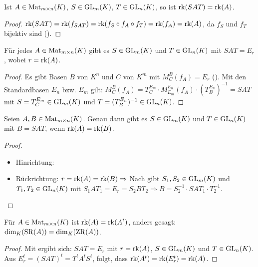 \begin{lemma}
	Ist $A\in \operatorname{Mat}_{m\times n}(K)$, $S\in \operatorname{GL}_m(K)$, $T\in \operatorname{GL}_n(K)$, so ist $\operatorname{rk}(SAT)=\operatorname{rk}(A)$.
\end{lemma}
\begin{proof}
	$\operatorname{rk}(SAT)=\operatorname{rk}(f_{SAT})=\operatorname{rk}(f_S\circ f_A\circ f_T)=\operatorname{rk}(f_A)=\operatorname{rk}(A)$, da $f_S$ und $f_T$ bijektiv sind ().
\end{proof}

\begin{proposition}
	Für jedes $A\in \operatorname{Mat}_{m\times n}(K)$ gibt es $S\in \operatorname{GL}_m(K)$ und $T\in \operatorname{GL}_n(K)$ mit $SAT=E_r$, wobei $r=\operatorname{rk}(A)$.
\end{proposition}
\begin{proof}
	Es gibt Basen $B$ von $K^n$ und $C$ von $K^m$ mit $M_C^B(f_A)=E_r$ (). Mit den Standardbasen $E_n$ bzw. $E_m$ gilt: $M_C^B(f_A)=T_C^{E_m}
	\cdot M_{E_m}^{E_n}(f_A)\cdot (T_B^{E_n})^{-1}=SAT$ mit $S=T_C^{E_m}\in \operatorname{GL}_m(K)$ und $T=(T_B^{E_n})^{-1}\in \operatorname{GL}_n(K)$.
\end{proof}

\begin{conclusion}
	Seien $A,B\in \operatorname{Mat}_{m\times n}(K)$. Genau dann gibt es $S\in \operatorname{GL}_m(K)$ und $T\in \operatorname{GL}_n(K)$ mit $B=SAT$, wenn 
	$\operatorname{rk}(A)=\operatorname{rk}(B)$.
\end{conclusion}
\begin{proof}
	\begin{itemize}
		\item Hinrichtung: 
		\item Rückrichtung: $r=\operatorname{rk}(A)=\operatorname{rk}(B)\Rightarrow$ Nach  gibt $S_1,S_2\in \operatorname{GL}_m(K)$ und $T_1,T_2\in \operatorname{GL}_n(K)$ mit $S_1AT_1=E_r=S_2BT_2 \Rightarrow 
		B=S_2^{-1}\cdot SAT_1\cdot T_2^{-1}$.
	\end{itemize}
\end{proof}

\begin{proposition}
	Für $A\in \operatorname{Mat}_{m\times n}(K)$ ist $\operatorname{rk}(A)=\operatorname{rk}(A^t)$, anders gesagt: $\dim_K(\operatorname{SR}(A))=\dim_K(\operatorname{ZR}(A))$.
\end{proposition}
\begin{proof}
	Mit  ergibt sich: $SAT=E_r$ mit $r=\operatorname{rk}(A)$, $S\in \operatorname{GL}_m(K)$ und $T\in \operatorname{GL}_n(K)$. Aus $E_r^t=(SAT)^t=T^tA^tS^t$, folgt, 
	dass $\operatorname{rk}(A^t)=\operatorname{rk}(E_r^t)=\operatorname{rk}(A)$.
\end{proof}


